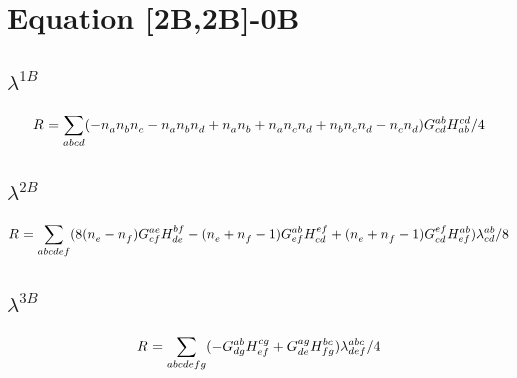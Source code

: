 \documentclass{scrartcl}
\begin{document}
    
\section{Equation [2B,2B]-0B}
\subsection{$\lambda^{1B}$}
\begin{dmath*}
R^{}_{} = \sum_{abcd} (-n^{}_{a} \* n^{}_{b} \* n^{}_{c}-n^{}_{a} \* n^{}_{b} \* n^{}_{d}+n^{}_{a} \* n^{}_{b}+n^{}_{a} \* n^{}_{c} \* n^{}_{d}+n^{}_{b} \* n^{}_{c} \* n^{}_{d}-n^{}_{c} \* n^{}_{d}) \* G^{ab}_{cd} \* H^{cd}_{ab}/4
\end{dmath*}
\subsection{$\lambda^{2B}$}
\begin{dmath*}
R^{}_{} = \sum_{abcdef} (8 \* (n^{}_{e}-n^{}_{f}) \* G^{ae}_{cf} \* H^{bf}_{de}-(n^{}_{e}+n^{}_{f}-1) \* G^{ab}_{ef} \* H^{ef}_{cd}+(n^{}_{e}+n^{}_{f}-1) \* G^{ef}_{cd} \* H^{ab}_{ef}) \* \lambda^{ab}_{cd}/8
\end{dmath*}
\subsection{$\lambda^{3B}$}
\begin{dmath*}
R^{}_{} = \sum_{abcdefg} (-G^{ab}_{dg} \* H^{cg}_{ef}+G^{ag}_{de} \* H^{bc}_{fg}) \* \lambda^{abc}_{def}/4
\end{dmath*}
\end{document}
